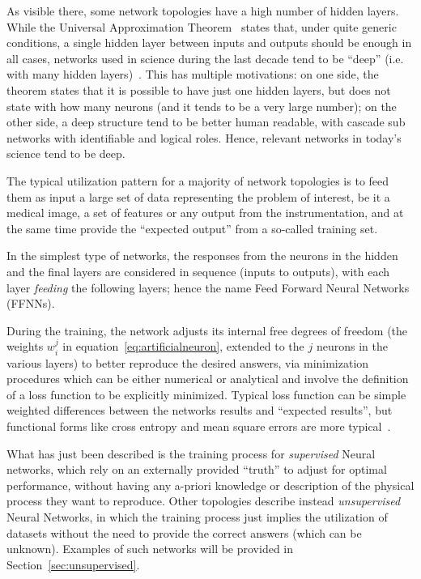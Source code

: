 As visible there, some network topologies have a high number of hidden layers. While the Universal Approximation Theorem~\cite{Hornik1991} states that, under quite generic conditions, a single hidden layer between inputs and outputs should be enough in all cases, networks used in science during the last decade tend to be ``deep'' (i.e. with many hidden layers)~\cite{Lecun2015}. This has multiple motivations: on one side, the theorem states that it is possible to have just one hidden layers, but does not state with how many neurons (and it tends to be a very large number); on the other side, a deep structure tend to be better human readable, with cascade sub networks with identifiable and logical roles. Hence, relevant networks in today's science tend to be deep.


The typical utilization pattern for a majority of network topologies is to feed them as input a large set of data representing the problem of interest, be it a medical image, a set of features or any output from the instrumentation, and at the same time provide the ``expected output''
from a so-called training set. 

In the simplest type of networks, the responses from the neurons in the hidden and the final layers are considered in sequence (inputs to outputs), with each layer \emph{feeding} the following layers; hence the name Feed Forward Neural Networks (FFNNs).

During the training, the network adjusts its internal free degrees of freedom (the weights $w_i^j$ in equation~\ref{eq:artificialneuron}, extended to the $j$ neurons in the various layers) to better reproduce the desired answers, via minimization procedures which can be either numerical or analytical and involve the definition of a loss function to be explicitly minimized. Typical loss function can be simple weighted differences between the networks results and ``expected results'', but functional forms like cross entropy and mean square errors are more typical~\cite{Wang2020}.

What has just been described is the training process for \emph{supervised} Neural networks, which rely on an externally provided ``truth'' to adjust for optimal performance, without having any a-priori knowledge or description of the physical process they want to reproduce.
Other topologies describe instead  \emph{unsupervised} Neural Networks, in which the training process just implies the utilization of datasets without the need to provide the correct answers (which can be unknown). Examples of such networks will be provided in Section~\ref{sec:unsupervised}.

